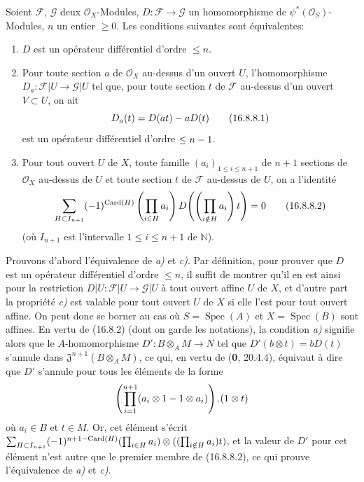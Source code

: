 \begin{proposition}[16.8.8]
\label{IV.16.8.8}
Soient $\mathscr{F}$, $\mathscr{G}$ deux $\mathcal{O}_X$-Modules,
$D:\mathscr{F}\to\mathscr{G}$ un homomorphisme de
$\psi^*(\mathcal{O}_S)$-Modules, $n$ un entier $\geq0$. Les conditions
suivantes sont équivalentes:
\begin{enumerate}
  \item[\textup{a)}] $D$ est un opérateur différentiel d'ordre $\leq n$.
  \item[\textup{b)}] Pour toute section $a$ de $\mathcal{O}_X$ au-dessus d'un ouvert
  $U$, l'homomorphisme $D_a:\mathscr{F}|U\to\mathscr{G}|U$ tel que, pour
  toute section $t$ de $\mathscr{F}$ au-dessus d'un ouvert $V\subset U$, on
  ait
  \[
    D_a(t)=D(at)- aD(t)
    \tag{16.8.8.1}
    \label{IV.16.8.8.1}
  \]
  est un opérateur différentiel d'ordre $\leq n- 1$.
  \item[\textup{c)}] Pour tout ouvert $U$ de $X$, toute famille
  $(a_i)_{1\leq i\leq n+1}$ de $n+1$ sections de $\mathcal{O}_X$ au-dessus
  de $U$ et toute section $t$ de $\mathscr{F}$ au-dessus de $U$, on a
  l'identité
  \[
    \sum_{H\subset I_{n+1}}(- 1)^{\operatorname{Card}(H)}
    \left(\prod_{i\in H}a_i\right)
    D\!\left(\left(\prod_{i\notin H}a_i\right)t\right)=0
    \tag{16.8.8.2}
    \label{IV.16.8.8.2}
  \]
  (où $I_{n+1}$ est l'intervalle $1\leq i\leq n+1$ de $\mathbb{N}$).
\end{enumerate}
\end{proposition}

Prouvons d'abord l'équivalence de \emph{a)} et \emph{c)}. Par définition, pour prouver que
$D$ est un opérateur différentiel d'ordre $\leq n$, il suffit de montrer qu'il
en est ainsi pour la restriction
$D|U:\mathscr{F}|U\to\mathscr{G}|U$ à tout ouvert affine $U$ de $X$, et
d'autre part la propriété \emph{c)} est valable pour tout ouvert $U$ de $X$ si elle
l'est pour tout ouvert affine. On peut donc se borner au cas où
$S=\operatorname{Spec}(A)$ et $X=\operatorname{Spec}(B)$ sont affines. En
vertu de (16.8.2) (dont on garde les notations), la condition \emph{a)} signifie
alors que le $A$-homomorphisme $D':B\otimes_A M\to N$ tel que
$D'(b\otimes t)=bD(t)$ s'annule dans
$\mathfrak{J}^{n+1}(B\otimes_A M)$, ce qui, en vertu de (\textbf{0}, 20.4.4), équivaut
à dire que $D'$ s'annule pour tous les éléments de la forme
\[
  \left(\prod_{i=1}^{n+1}(a_i\otimes1- 1\otimes a_i)\right).(1\otimes t)
\]
où $a_i\in B$ et $t\in M$. Or, cet élément s'écrit
$\sum_{H\subset I_{n+1}}(- 1)^{n+1-\operatorname{Card}(H)}(\prod_{i\in H}a_i)\otimes((\prod_{i\notin H}a_i)t)$,
et la valeur de $D'$ pour cet élément n'est autre que le premier membre de
(16.8.8.2), ce qui prouve l'équivalence de \emph{a)} et \emph{c)}.


